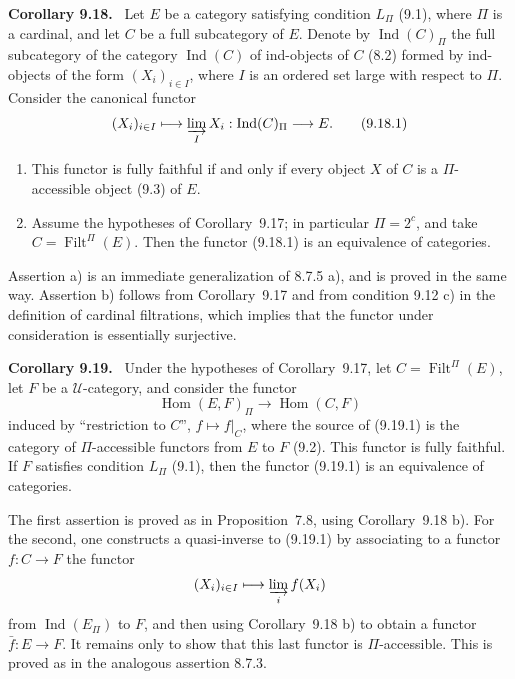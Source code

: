 \documentclass[11pt]{article}
\newcommand{\U}{\mathcal{U}}
\newcommand{\Ind}{\operatorname{Ind}}
\newcommand{\Filt}{\operatorname{Filt}}
\newcommand{\Hhom}{\operatorname{Hom}}
\newenvironment{statement}[1]{\par\medskip\noindent\textbf{#1.}\ }{\par\medskip}
\begin{document}
\begin{statement}{Corollary 9.18}
Let $E$ be a category satisfying condition $L_\Pi$ (9.1), where $\Pi$ is a cardinal, and let $C$ be a full subcategory of $E$. Denote by $\Ind(C)_\Pi$ the full subcategory of the category $\Ind(C)$ of ind-objects of $C$ (8.2) formed by ind-objects of the form $(X_i)_{i\in I}$, where $I$ is an ordered set large with respect to $\Pi$. Consider the canonical functor
\begin{equation}
 (X_i)_{i\in I}\longmapsto \varinjlim_I X_i:\Ind(C)_\Pi\longrightarrow E.
 \tag{9.18.1}
\end{equation}
\begin{enumerate}[label=\alph*)]
\item This functor is fully faithful if and only if every object $X$ of $C$ is a $\Pi$-accessible object (9.3) of $E$.
\item Assume the hypotheses of Corollary~9.17; in particular $\Pi=2^c$, and take $C=\Filt^\Pi(E)$. Then the functor (9.18.1) is an equivalence of categories.
\end{enumerate}
\end{statement}

Assertion a) is an immediate generalization of 8.7.5 a), and is proved in the same way. Assertion b) follows from Corollary~9.17 and from condition 9.12 c) in the definition of cardinal filtrations, which implies that the functor under consideration is essentially surjective.

\begin{statement}{Corollary 9.19}
Under the hypotheses of Corollary~9.17, let $C=\Filt^\Pi(E)$, let $F$ be a $\U$-category, and consider the functor
\begin{equation}
 \Hhom(E,F)_\Pi\longrightarrow \Hhom(C,F)
 \tag{9.19.1}
\end{equation}
induced by ``restriction to $C$'', $f\mapsto f|_C$, where the source of (9.19.1) is the category of $\Pi$-accessible functors from $E$ to $F$ (9.2). This functor is fully faithful. If $F$ satisfies condition $L_\Pi$ (9.1), then the functor (9.19.1) is an equivalence of categories.
\end{statement}

The first assertion is proved as in Proposition~7.8, using Corollary~9.18 b). For the second, one constructs a quasi-inverse to (9.19.1) by associating to a functor $f:C\to F$ the functor
\[
 (X_i)_{i\in I}\longmapsto \varinjlim_i f(X_i)
\]
from $\Ind(E_\Pi)$ to $F$, and then using Corollary~9.18 b) to obtain a functor $\bar f:E\to F$. It remains only to show that this last functor is $\Pi$-accessible. This is proved as in the analogous assertion 8.7.3.
\end{document}
